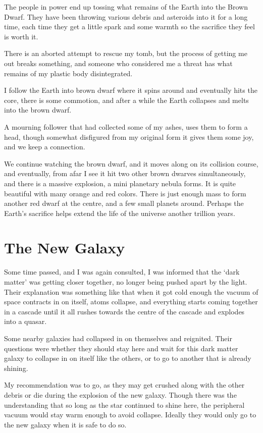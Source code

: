 The people in power end up tossing what remains of the Earth into the Brown Dwarf.  
They have been throwing various debris and asteroids into it for a long time,
each time they get a little spark and some warmth so the sacrifice they feel is
worth it. 

There is an aborted attempt to rescue my tomb, but the process of getting me out breaks
something, and someone who considered me a threat has what remains of my plastic
body disintegrated. 

I follow the Earth into brown dwarf where it spins around and eventually hits
the core, there is some commotion, and after a  while the Earth collapses and
melts into the brown dwarf. 

A mourning follower that had collected some of my ashes, uses them to form a
head, though somewhat disfigured from my original form it gives them some joy,
and we keep a connection. 

We continue watching the brown dwarf, and it moves along on its collision
course, and eventually, from afar I see it hit two other brown dwarves 
simultaneously, and there is a massive explosion, a mini planetary nebula forms.
It is quite beautiful with many orange and red colors. 
There is just enough mass to form another red dwarf at the centre, and a few 
small planets around. Perhaps the Earth's sacrifice helps extend the life of the 
universe another trillion years. 

\section{The New Galaxy}

Some time passed, and I was again consulted, I was informed that the `dark
matter' was getting closer together, no longer being pushed apart by the light.
Their explanation was something like that when it got cold enough the vacuum of
space contracts in on itself, atoms collapse, and everything starts coming
together in a cascade until it all rushes towards the centre of the cascade and
explodes into a quasar. 

Some nearby galaxies had collapsed in on themselves and reignited.  Their
questions were whether they should stay here and wait for this dark matter galaxy
to collapse in on itself like the others, or to go to another that is already
shining. 

My recommendation was to go, as they may get crushed along with the other debris
or die during the explosion of the new galaxy. Though there was the
understanding that so long as the star continued to shine here, the peripheral
vacuum would stay warm enough to avoid collapse. Ideally they would only
go to the new galaxy when it is safe to do so. 

